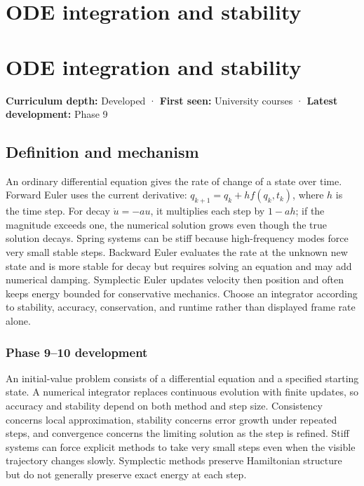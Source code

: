 \hypertarget{appendix-18eacf61a04b}{}
\section*{ODE integration and stability}
\section{ODE integration and stability}\label{ode-integration-and-stability}

\textbf{Curriculum depth:} Developed · \textbf{First seen:} University courses · \textbf{Latest development:} Phase 9

\subsection{Definition and mechanism}\label{definition-and-mechanism}

An ordinary differential equation gives the rate of change of a state over time. Forward Euler uses the current derivative: \(q_{k+1}=q_k+h f(q_k,t_k)\), where \(h\) is the time step. For decay \(\dot u=-au\), it multiplies each step by \(1-ah\); if the magnitude exceeds one, the numerical solution grows even though the true solution decays. Spring systems can be stiff because high-frequency modes force very small stable steps. Backward Euler evaluates the rate at the unknown new state and is more stable for decay but requires solving an equation and may add numerical damping. Symplectic Euler updates velocity then position and often keeps energy bounded for conservative mechanics. Choose an integrator according to stability, accuracy, conservation, and runtime rather than displayed frame rate alone.

\subsubsection{Phase 9--10 development}\label{phase-910-development}

An initial-value problem consists of a differential equation and a specified starting state. A numerical integrator replaces continuous evolution with finite updates, so accuracy and stability depend on both method and step size. Consistency concerns local approximation, stability concerns error growth under repeated steps, and convergence concerns the limiting solution as the step is refined. Stiff systems can force explicit methods to take very small steps even when the visible trajectory changes slowly. Symplectic methods preserve Hamiltonian structure but do not generally preserve exact energy at each step.

